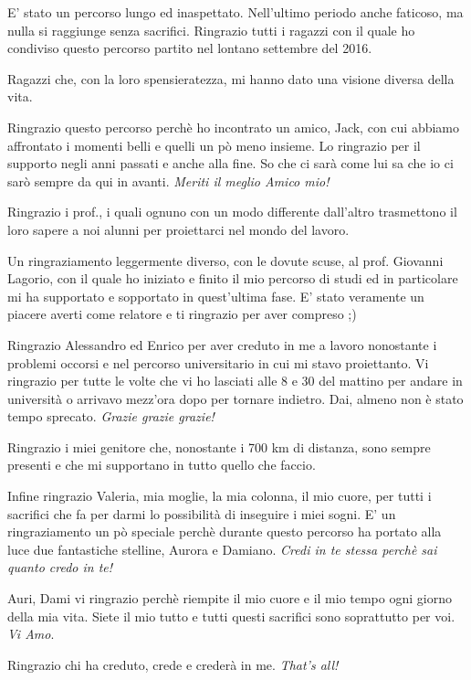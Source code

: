\documentclass{masterthesis}
\begin{document}
\begin{acknowledgements}
E' stato un percorso lungo ed inaspettato. Nell'ultimo periodo anche faticoso, ma nulla si raggiunge senza sacrifici. Ringrazio tutti i ragazzi con il quale ho condiviso questo percorso partito nel lontano settembre del 2016. 

Ragazzi che, con la loro spensieratezza, mi hanno dato una visione diversa della vita. 

Ringrazio questo percorso perchè ho incontrato un amico, Jack, con cui abbiamo affrontato i momenti belli e quelli un pò meno insieme. Lo ringrazio per il supporto negli anni passati e anche alla fine. So che ci sarà come lui sa che io ci sarò sempre da qui in avanti. \emph{Meriti il meglio Amico mio!}

Ringrazio i prof., i quali ognuno con un modo differente dall'altro trasmettono il loro sapere a noi alunni per proiettarci nel mondo del lavoro.

Un ringraziamento leggermente diverso, con le dovute scuse, al prof. Giovanni Lagorio, con il quale ho iniziato e finito il mio percorso di studi ed in particolare mi ha supportato e sopportato in quest'ultima fase. E' stato veramente un piacere averti come relatore e ti ringrazio per aver compreso ;)

Ringrazio Alessandro ed Enrico per aver creduto in me a lavoro nonostante i problemi occorsi e nel percorso universitario in cui mi stavo proiettanto. Vi ringrazio per tutte le volte che vi ho lasciati alle 8 e 30 del mattino per andare in università o arrivavo mezz'ora dopo per tornare indietro. Dai, almeno non è stato tempo sprecato. \emph{Grazie grazie grazie!}

Ringrazio i miei genitore che, nonostante i 700 km di distanza, sono sempre presenti e che mi supportano in tutto quello che faccio.  

Infine ringrazio Valeria, mia moglie, la mia colonna, il mio cuore, per tutti i sacrifici che fa per darmi lo possibilità di inseguire i miei sogni. E' un ringraziamento un pò speciale perchè durante questo percorso ha portato alla luce due fantastiche stelline, Aurora e Damiano. \emph{Credi in te stessa perchè sai quanto credo in te!}

Auri, Dami vi ringrazio perchè riempite il mio cuore e il mio tempo ogni giorno della mia vita. Siete il mio tutto e tutti questi sacrifici sono soprattutto per voi. \emph{Vi Amo}.

Ringrazio chi ha creduto, crede e crederà in me. \emph{That's all!}

\end{acknowledgements}
\end{document}

